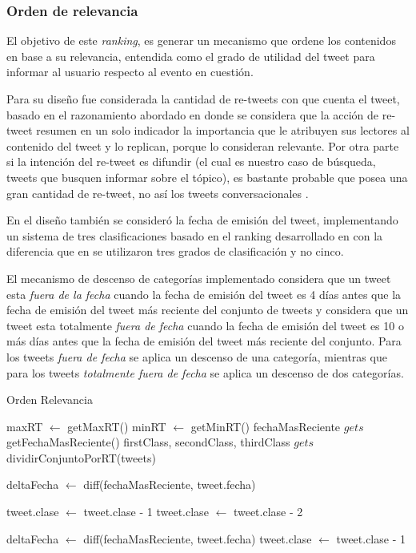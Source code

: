 \subsubsection{Orden de relevancia}\label{subsubsec:orden-rel} 	

El objetivo de este \emph{ranking}, es generar un mecanismo que ordene los contenidos en base a su relevancia, entendida como el grado de utilidad del tweet para informar al usuario respecto al evento en cuestión.

Para su diseño fue considerada la cantidad de re-tweets con que cuenta el tweet, basado en el razonamiento abordado en \cite{conf/cikm/UysalC11} donde se considera que la acción de re-tweet resumen en un solo indicador la importancia que le atribuyen sus lectores al contenido del tweet y lo replican, porque lo consideran relevante. Por otra parte si la intención del re-tweet es difundir (el cual es nuestro caso de búsqueda, tweets que busquen informar sobre el tópico), es bastante probable que posea una gran cantidad de re-tweet, no así los tweets conversacionales \cite{Yamaguchi:2010:TTU:1991336.1991364}.
 
 En el diseño también se consideró la fecha de emisión del tweet, implementando un sistema de tres clasificaciones basado en el ranking desarrollado en \cite{Dong:2010:TEI:1772690.1772725} con la diferencia que en se utilizaron tres grados de clasificación y no cinco.

El mecanismo de descenso de categorías implementado considera que un tweet esta \emph{fuera de la fecha} cuando la fecha de emisión del tweet es 4 días antes que la fecha de emisión del tweet más reciente del conjunto de tweets y considera que un tweet esta totalmente \emph{fuera de fecha} cuando la fecha de emisión del tweet es 10 o más días antes que la fecha de emisión del tweet más reciente del conjunto. Para los tweets \emph{fuera de fecha} se aplica un descenso de una categoría, mientras que para los tweets \emph{totalmente fuera de fecha} se aplica un descenso de dos categorías.

\begin{algorithm}[H]
	\caption{Orden Relevancia}\label{OrdenRel}
	\begin{algorithmic}[1]
		\State maxRT $\gets$ getMaxRT()
		\State minRT $\gets$ getMinRT()
		\State fechaMasReciente $gets$ getFechaMasReciente()
		\State firstClass, secondClass, thirdClass $gets$ dividirConjuntoPorRT(tweets)
		
		\State deltaFecha $\gets$ diff(fechaMasReciente, tweet.fecha)
		
			\State tweet.clase $\gets$ tweet.clase - 1
				\State tweet.clase $\gets$ tweet.clase - 2
		\EndIf
		
		\EndFor
		
		\State deltaFecha $\gets$ diff(fechaMasReciente, tweet.fecha)
				\State tweet.clase $\gets$ tweet.clase - 1
			\EndIf
		\EndFor	
		\EndFunction
	\end{algorithmic}
\end{algorithm}

